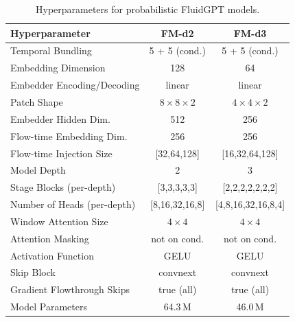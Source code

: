 
\begin{table}[H]
\centering
\caption{Hyperparameters for probabilistic FluidGPT models.}
\label{tab:fluidgpt_hparams_prob}
\begin{tabular}{lcc}
\toprule
\textbf{Hyperparameter} & \textbf{FM-d2} & \textbf{FM-d3} \\
\midrule
Temporal Bundling             & 5 + 5 (cond.) & 5 + 5 (cond.) \\
Embedding Dimension           & 128          & 64           \\
Embedder Encoding/Decoding    & linear       & linear       \\
Patch Shape                   & $8{\times}8{\times}2$ & $4{\times}4{\times}2$ \\
Embedder Hidden Dim.          & 512          & 256          \\
Flow-time Embedding Dim.      & 256          & 256          \\
Flow-time Injection Size      & [32,64,128]  & [16,32,64,128] \\
Model Depth                   & 2            & 3            \\
Stage Blocks (per-depth)      & [3,3,3,3,3]  & [2,2,2,2,2,2,2] \\
Number of Heads (per-depth)   & [8,16,32,16,8] & [4,8,16,32,16,8,4] \\
Window Attention Size         & $4{\times}4$ & $4{\times}4$ \\
Attention Masking             & not on cond. & not on cond. \\
Activation Function           & GELU         & GELU         \\
Skip Block                    & convnext     & convnext     \\
Gradient Flowthrough Skips    & true (all)   & true (all)   \\
Model Parameters              & 64.3\,M      & 46.0\,M      \\
\bottomrule
\end{tabular}
\end{table}
